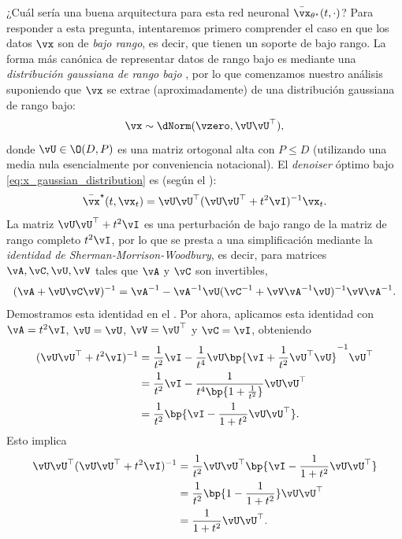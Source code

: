 \documentclass[../../book-main.tex]{subfiles}
\begin{document}
¿Cuál sería una buena arquitectura para esta red neuronal
\(\bar{\vx}_{\theta^{\star}}(t, \cdot)\)? Para responder a esta pregunta,
intentaremos primero comprender el caso en que los datos \(\vx\) son
de \textit{bajo rango}, es decir, que tienen un soporte de bajo rango. La forma más canónica
de representar datos de rango bajo es mediante una \textit{distribución gaussiana de rango bajo
}, por lo que comenzamos nuestro análisis suponiendo que \(\vx\)
se extrae (aproximadamente) de una distribución gaussiana de rango bajo:
\begin{equation}\label{eq:x_gaussian_distribution}
    \vx \sim \dNorm(\vzero, \vU\vU^{\top}),
\end{equation}
donde \(\vU \in \O(D, P)\) es una matriz ortogonal alta con \(P \leq
D\) (utilizando una media nula esencialmente por conveniencia notacional). El
\textit{denoiser} óptimo bajo \eqref{eq:x_gaussian_distribution} es (según
el ):
\begin{equation}\label{eq:optimal denoiser}
    \bar{\vx}^{\star}(t, \vx_{t}) = \vU\vU^{\top}(\vU\vU^{\top} +
    t^{2}\vI)^{-1}\vx_{t}.
\end{equation}
La matriz  \(\vU\vU^{\top} + t^{2}\vI\) es una perturbación de bajo rango
de la matriz de rango completo \(t^{2}\vI\), por lo que se presta a
una simplificación mediante la \textit{identidad de Sherman-Morrison-Woodbury},
es decir, para matrices \(\vA, \vC, \vU, \vV\) tales que \(\vA\) y
\(\vC\) son invertibles,
\begin{equation}\label{eq:sherman_morrison_woodbury}
    (\vA + \vU\vC\vV)^{-1} = \vA^{-1} - \vA^{-1}\vU(\vC^{-1} +
    \vV\vA^{-1}\vU)^{-1}\vV\vA^{-1}.
\end{equation}
Demostramos esta identidad en el
.  Por ahora, aplicamos
esta identidad con \(\vA = t^{2}\vI\), \(\vU = \vU\), \(\vV =
\vU^{\top}\) y \(\vC = \vI\), obteniendo
\begin{align}
    (\vU\vU^{\top} + t^{2}\vI)^{-1}
    &= \frac{1}{t^{2}}\vI - \frac{1}{t^{4}}\vU\bp{\vI +
    \frac{1}{t^{2}}\vU^{\top}\vU}^{-1}\vU^{\top} \\
    &= \frac{1}{t^{2}}\vI - \frac{1}{t^{4}\bp{1 +
    \frac{1}{t^{2}}}}\vU\vU^{\top} \\
    &= \frac{1}{t^{2}}\bp{\vI - \frac{1}{1 +
    t^{2}}\vU\vU^{\top}}.\label{eq:gaussian_lowrank_inverse_perturbation_simplified}
\end{align}
Esto implica
\begin{align}
    \vU\vU^{\top}(\vU\vU^{\top} + t^{2}\vI)^{-1}
    &= \frac{1}{t^{2}}\vU\vU^{\top}\bp{\vI - \frac{1}{1 +
    t^{2}}\vU\vU^{\top}} \\
    &= \frac{1}{t^{2}}\bp{1 - \frac{1}{1 + t^{2}}}\vU\vU^{\top} \\
    &= \frac{1}{1 +
    t^{2}}\vU\vU^{\top}.\label{eq:gaussian_lowrank_denoiser_simplified}
\end{align}
\end{document}
